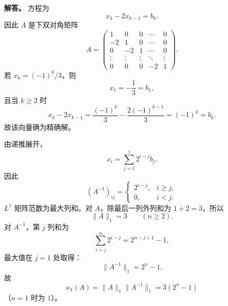 ﻿\documentclass[UTF8,12pt]{ctexart}
\begin{document}
\begin{enumerate}[label=\textbf{\arabic*.},leftmargin=2.2em]
\textbf{解答。} 方程为
\[
x_k-2x_{k-1}=b_k.
\]
因此 \(A\) 是下双对角矩阵
\[
A=\begin{pmatrix}
1&0&0&\cdots&0\\
-2&1&0&\cdots&0\\
0&-2&1&\cdots&0\\
\vdots&\vdots&\vdots&\ddots&\vdots\\
0&0&0&-2&1
\end{pmatrix}.
\]
若 \(x_k=(-1)^k/3\)，则
\[
x_1=-\frac13=b_1,
\]
且当 \(k\ge2\) 时
\[
x_k-2x_{k-1}
=\frac{(-1)^k}{3}-\frac{2(-1)^{k-1}}{3}
=(-1)^k=b_k.
\]
故该向量确为精确解。

由递推展开，
\[
x_i=\sum_{j=1}^i2^{i-j}b_j.
\]
因此
\[
(A^{-1})_{ij}=
\begin{cases}
2^{i-j},& i\ge j,\\
0,& i<j.
\end{cases}
\]
\(L^1\) 矩阵范数为最大列和。对 \(A\)，除最后一列外列和为 \(1+2=3\)，所以
\[
\|A\|_1=3\qquad(n\ge2).
\]
对 \(A^{-1}\)，第 \(j\) 列和为
\[
\sum_{i=j}^n2^{i-j}=2^{n-j+1}-1,
\]
最大值在 \(j=1\) 处取得：
\[
\|A^{-1}\|_1=2^n-1.
\]
故
\[
\kappa_1(A)=\|A\|_1\|A^{-1}\|_1=3(2^n-1)
\]
（\(n=1\) 时为 \(1\)）。
\end{enumerate}
\end{document}

